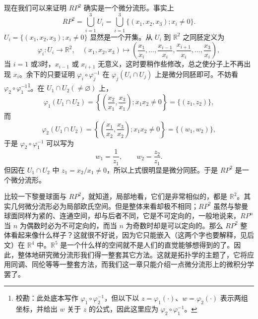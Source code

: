 现在我们可以来证明 $RP^2$ 确实是一个微分流形。事实上
\begin{equation}
 RP^2=\bigcup_{i=1}^3U_i
 =\bigcup_{i=1}^3\{(x_1,x_2,x_3);x_i\ne0\}.
 \tag{6}
\end{equation}
$U_i=\{(x_1,x_2,x_3);x_i\ne0\}$ 显然是一个开集。从 $U_i$ 到 $\mathbb R^2$ 之同胚定义为
\[
 \varphi_i:U_i\longrightarrow\mathbb R^2,
 \quad (x_1,x_2,x_3)\longmapsto
 \left(\frac{x_1}{x_i},\ldots,\frac{x_{i-1}}{x_i},
 \frac{x_{i+1}}{x_i},\ldots,\frac{x_3}{x_i}\right),
\]
当 $i=1$ 或3时，$x_{i-1}$ 或 $x_{i+1}$ 无意义，这时要稍作些修改，总之使分子上不再出现 $x_i$。余下的只要证明 $\varphi_i\circ\varphi_j^{-1}$ 在 $\varphi_j(U_i\cap U_j)$ 上是微分同胚即可。不妨看 $\varphi_2\circ\varphi_1^{-1}$\footnote{校勘：此处底本写作 $\varphi_1\circ\varphi_2^{-1}$，但以下以 $z=\varphi_1(\cdot)$、$w=\varphi_2(\cdot)$ 表示两组坐标，并给出 $w$ 关于 $z$ 的公式，因此这里应为 $\varphi_2\circ\varphi_1^{-1}$。}。在 $U_1\cap U_2(\ne\varnothing)$ 上，
\[
 \varphi_1(U_1\cap U_2)
 =\left\{\left(\frac{x_2}{x_1},\frac{x_3}{x_1}\right);x_1x_2\ne0\right\}
 =\{(z_1,z_2)\},
\]
而
\[
 \varphi_2(U_1\cap U_2)
 =\left\{\left(\frac{x_1}{x_2},\frac{x_3}{x_2}\right);x_1x_2\ne0\right\}
 =\{(w_1,w_2)\},
\]
于是 $\varphi_2\circ\varphi_1^{-1}$ 可以写为
\[
 w_1=\frac1{z_1},\qquad w_2=\frac{z_2}{z_1}.
\]
但因在 $U_1\cap U_2$ 中 $z_1=x_2/x_1\ne0$，所以上式很明显是微分同胚。于是 $RP^2$ 是一个微分流形。

比较一下黎曼球面与 $RP^2$，就知道，局部地看，它们是非常相似的，都是 $\mathbb R^2$。其实几何微分流形必为局部欧氏空间。但是整体来看却极不相同；$RP^2$ 虽然与黎曼球面同样为紧的、连通空间，却与后者不同，它是不可定向的，一般地说来，$RP^n$ 当 $n$ 为偶数时必为不可定向的，而当 $n$ 为奇数时却是可以定向的。那么 $RP^2$ 整体看起来像什么样子？这就很不好说，因为它只能嵌入（这两个字也要解释，见后文）在 $\mathbb R^4$ 中。$\mathbb R^5$ 是一个什么样的空间就不是人们的直觉能够想得到的了。因此，整体地研究微分流形我们得一整套其它方法。这就是拓扑学的主题了，它将应用同调、同伦等等一整套方法，而我们这一章只能介绍一点微分流形上的微积分学罢了。

